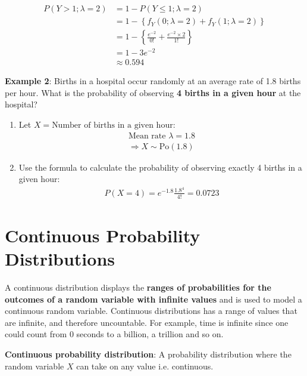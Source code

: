 \documentclass[10pt,a4paper]{article}
\begin{document}
\begin{enumerate}
\begin{enumerate}
            \begin{align*}
                P(Y>1;\lambda = 2) &= 1 - P(Y\leq 1; \lambda = 2) \\
                &= 1 - \left\{f_Y(0; \lambda = 2)+f_Y(1;\lambda = 2)\right\} \\
                &= 1 - \left\{\frac{e^{-2}}{0!}+\frac{e^{-2}\times 2}{1!}\right\} \\
                &= 1 -3e^{-2} \\
                &\approx 0.594
            \end{align*}
        \end{enumerate}
\end{enumerate}

\textbf{Example 2}: Births in a hospital occur randomly at an average rate of 1.8 births per hour.
What is the probability of observing \textbf{4 births in a given hour} at the hospital?
\begin{enumerate}
    \item Let $X = \text{Number of births in a given hour}$:
    \begin{align*}
        \text{Mean rate } \lambda = 1.8 \\
        \Rightarrow X \sim \text{Po}(1.8)
    \end{align*}
    \item Use the formula to calculate the probability of observing exactly 4 births in a given hour:
    \begin{align*}
        P(X=4) = e^{-1.8}\frac{1.8^4}{4!} = 0.0723 
    \end{align*}
\end{enumerate}

\pagebreak

\section{Continuous Probability Distributions}

A continuous distribution displays the \textbf{ranges of probabilities for the outcomes of a random
variable with infinite values} and is used to model a continuous random variable. Continuous
distributions has a range of values that are infinite, and therefore uncountable. For example, time
is infinite since one could count from $0$ seconds to a billion, a trillion and so on. 

\begin{tcolorbox}[breakable,colback=white]
\textbf{Continuous probability distribution}: A probability distribution where the random variable
$X$ can take on any value i.e. continuous.
\end{tcolorbox}
\end{document}
